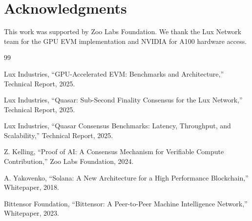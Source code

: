 \section*{Acknowledgments}


This work was supported by Zoo Labs Foundation. We thank the Lux Network team for the GPU EVM implementation and NVIDIA for A100 hardware access.


\begin{thebibliography}{99}

Lux Industries, ``GPU-Accelerated EVM: Benchmarks and Architecture,'' Technical Report, 2025.

Lux Industries, ``Quasar: Sub-Second Finality Consensus for the Lux Network,'' Technical Report, 2025.

Lux Industries, ``Quasar Consensus Benchmarks: Latency, Throughput, and Scalability,'' Technical Report, 2025.

Z. Kelling, ``Proof of AI: A Consensus Mechanism for Verifiable Compute Contribution,'' Zoo Labs Foundation, 2024.

A. Yakovenko, ``Solana: A New Architecture for a High Performance Blockchain,'' Whitepaper, 2018.

Bittensor Foundation, ``Bittensor: A Peer-to-Peer Machine Intelligence Network,'' Whitepaper, 2023.

\end{thebibliography}

